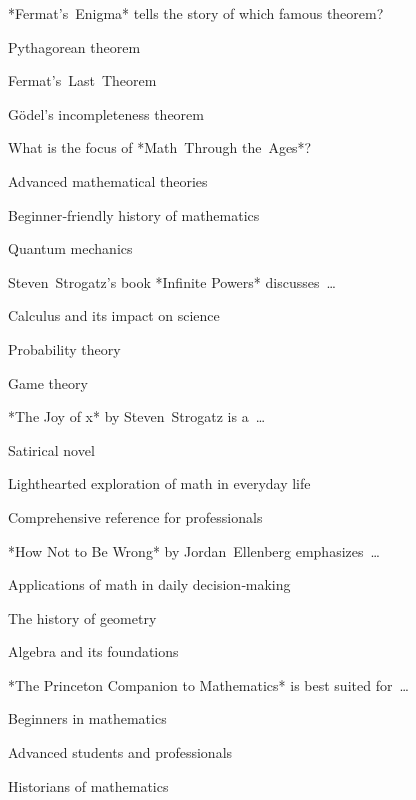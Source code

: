 \begin{enhancedmcq}{*Fermat's Enigma* tells the story of which famous theorem?}
\item Pythagorean theorem
\item Fermat's Last Theorem
\item Gödel's incompleteness theorem

\end{enhancedmcq}
\begin{enhancedmcq}{What is the focus of *Math Through the Ages*?}
\item Advanced mathematical theories
\item Beginner‑friendly history of mathematics
\item Quantum mechanics

\end{enhancedmcq}
\begin{enhancedmcq}{Steven Strogatz's book *Infinite Powers* discusses …}
\item Calculus and its impact on science
\item Probability theory
\item Game theory

\end{enhancedmcq}
\begin{enhancedmcq}{*The Joy of x* by Steven Strogatz is a …}
\item Satirical novel
\item Lighthearted exploration of math in everyday life
\item Comprehensive reference for professionals

\end{enhancedmcq}
\begin{enhancedmcq}{*How Not to Be Wrong* by Jordan Ellenberg emphasizes …}
\item Applications of math in daily decision‑making
\item The history of geometry
\item Algebra and its foundations

\end{enhancedmcq}
\begin{enhancedmcq}{*The Princeton Companion to Mathematics* is best suited for …}
\item Beginners in mathematics
\item Advanced students and professionals
\item Historians of mathematics

\end{enhancedmcq}
